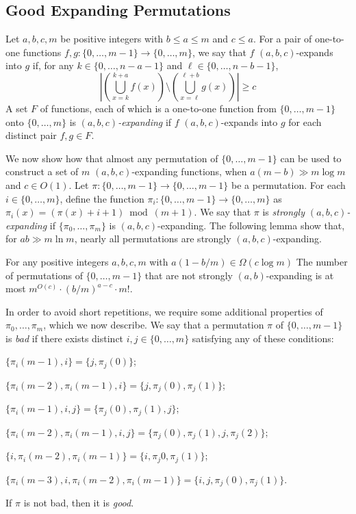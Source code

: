 \documentclass[kpfonts]{patmorin}
\begin{document}
\subsection{Good Expanding Permutations}
\label{permutations}

Let $a,b,c,m$ be positive integers with $b \le a \le m$ and $c\le a$.  For a pair of one-to-one functions $f,g:\{0,\ldots,m-1\}\to\{0,\ldots,m\}$, we say that $f$ $(a,b,c)$-expands into $g$ if, for any $k\in\{0,\ldots,n-a-1\}$ and $\ell\in\{0,\ldots,n-b-1\}$,
\[ \left|\left(\bigcup_{x=k}^{k+a}f(x)\right)
    \setminus\left(\bigcup_{x=\ell}^{\ell+b}g(x)\right) \right| \ge c
\]
A set $F$ of functions, each of which is a one-to-one function from $\{0,\ldots,m-1\}$ onto $\{0,\ldots,m\}$ is \emph{$(a,b,c)$-expanding} if $f$ $(a,b,c)$-expands into $g$ for each distinct pair $f,g\in F$.

We now show how that almost any permutation of $\{0,\ldots,m-1\}$ can be used to construct a set of $m$ $(a,b,c)$-expanding functions, when $a(m-b)\gg m\log m$ and $c\in O(1)$.  Let $\pi:\{0,\ldots,m-1\}\to\{0,\ldots,m-1\}$ be a permutation.  For each $i\in\{0,\ldots,m\}$, define the function $\pi_i:\{0,\ldots,m-1\}\to\{0,\ldots,m\}$ as $\pi_i(x)=(\pi(x)+i+1)\bmod (m+1)$.  We say that $\pi$ is \emph{strongly $(a,b,c)$-expanding} if  $\{\pi_0,\ldots,\pi_{m}\}$ is $(a,b,c)$-expanding.  The following lemma show that, for $ab\gg m\ln m$, nearly all permutations are strongly $(a,b,c)$-expanding.

\begin{lem}\label{strongly_ab_expanding}
    For any positive integers $a,b,c,m$ with $a(1-b/m) \in \Omega(c\log m)$
    The number of permutations of $\{0,\ldots,m-1\}$ that are not strongly $(a,b)$-expanding is at most $m^{O(c)}\cdot (b/m)^{a-c}\cdot m!$.
\end{lem}

In order to avoid short repetitions, we require some additional properties of $\pi_0,\ldots,\pi_m$, which we now describe.  We say that a permutation $\pi$ of $\{0,\ldots,m-1\}$ is \emph{bad} if there exists distinct $i,j\in\{0,\ldots,m\}$ satisfying any of these conditions:
\begin{compactenum}[(C1)]
    \item $\{\pi_i(m-1),i\}=\{j,\pi_j(0)\}$;\label{two_two}\label{first}
    \item $\{\pi_i(m-2),\pi_i(m-1),i\} = \{j,\pi_j(0),\pi_j(1)\}$;\label{three_three}

    \item $\{\pi_i(m-1),i,j\}=\{\pi_j(0),\pi_j(1),j\}$;\label{two_three}
    \item $\{\pi_i(m-2),\pi_i(m-1),i,j\}=\{\pi_j(0),\pi_j(1),j,\pi_j(2)\}$;\label{three_four}

    \item $\{i,\pi_i(m-2),\pi_i(m-1)\}=\{i,\pi_j{0},\pi_j(1)\}$;
    \item $\{\pi_i(m-3),i,\pi_i(m-2),\pi_i(m-1)\}=\{i,j,\pi_j(0),\pi_j(1)\}$.\label{last}
\end{compactenum}
If $\pi$ is not bad, then it is \emph{good}.
\end{document}
